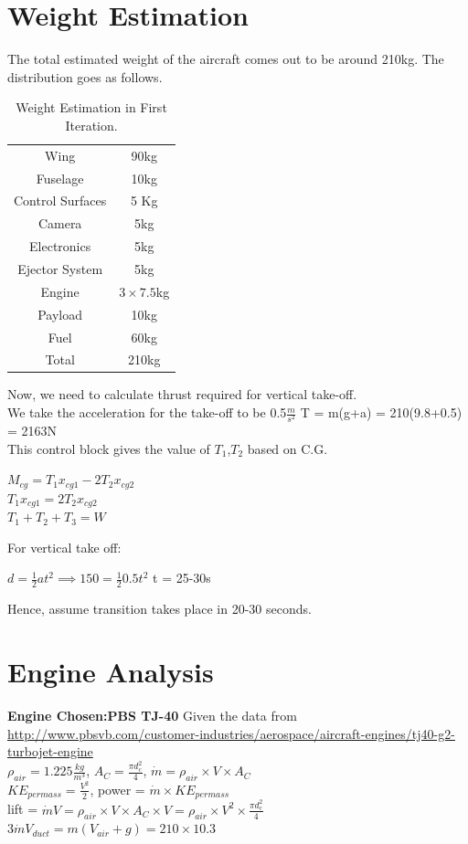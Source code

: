 \section{Weight Estimation}
The total estimated weight of the aircraft comes out to be around 210kg. The distribution goes as follows.\\
\begin{table}[H]
\begin{center}
\begin{tabular}{ |c| c| }
\hline
 Wing & 90kg \\ 
 Fuselage & 10kg \\ 
 Control Surfaces & 5 Kg \\ 
 Camera & 5kg \\
 Electronics & 5kg \\
 Ejector System & 5kg \\
 Engine & $3\times7.5$kg \\
 Payload & 10kg \\
 Fuel & 60kg \\
 \hline
 Total & 210kg \\
\hline
\end{tabular}
\end{center}
\caption{Weight Estimation in First Iteration.}
\label{Table1}
\end{table}
Now, we need to calculate thrust required for vertical take-off. \\
We take the acceleration for the take-off to be 0.5$\frac{m}{s^2}$
T = m(g+a) = 210(9.8+0.5) = 2163N \\
This control block gives the value of $T_1$,$T_2$ based on C.G.
\begin{center}
$M_{cg} = T_1x_{cg1} - 2T_2x_{cg2}$ \\
$T_1x_{cg1} = 2T_2x_{cg2}$ \\
$T_1 + T_2 + T_3 = W$ \\
\end{center}
For vertical take off:
\begin{center}
$d = \frac{1}{2}at^2 \implies 150 = \frac{1}{2}0.5t^2$
t = 25-30s
\end{center}
Hence, assume transition takes place in 20-30 seconds. 
\section{Engine Analysis}
\textbf{Engine Chosen:PBS TJ-40} Given the data from  \url{http://www.pbsvb.com/customer-industries/aerospace/aircraft-engines/tj40-g2-turbojet-engine} \\
$\rho_{air} = 1.225\frac{kg}{m^3}$, $A_C = \frac{\pi d_c^2}{4}$, $\dot{m} = \rho_{air} \times V \times A_C$ \\
$KE_{per mass} = \frac{V^2}{2}$, power = $\dot{m}\times KE_{per mass}$ \\
lift = $\dot{m}V = \rho_{air}\times V\times A_C\times V = \rho_{air}\times V^2 \times \frac{\pi d_c^2}{4}$ \\
$3\dot{m}V_{duct} = m(V_{air} + g) = 210\times 10.3$
